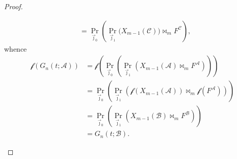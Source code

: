 \documentclass[10pt,a4paper]{amsart}
\newcommand{\A}{\mathcal{A}}
\newcommand{\B}{\mathcal{B}}
\newcommand{\C}{\mathcal{C}}
\newcommand{\f}{\mathcal{f}}
\begin{document}
\begin{proof}
\begin{enumerate}
\begin{align*}
            &= \Pr_{\vec\jmath_0}\left(\Pr_{\vec\jmath_1}\big( X_{m-1}(\C)  \big)\bowtie_m F^\C \right),
        \end{align*}
        whence
        \begin{align*}
            \f(G_n(t;\A)) &= \f\left( \Pr_{\vec\jmath_0}\left(\Pr_{\vec\jmath_1}\left( X_{m-1}(\A) \bowtie_m F^\A \right)\right) \right) \\
            &= \Pr_{\vec\jmath_0}\left(\Pr_{\vec\jmath_1}\left( \f(X_{m-1}(\A)) \bowtie_m \f(F^\A) \right)\right) \\
            &= \Pr_{\vec\jmath_0}\left(\Pr_{\vec\jmath_1}\left( X_{m-1}(\B) \bowtie_m F^\B \right)\right) \\
            &= G_n(t;\B).
        \end{align*}
    \end{enumerate}


\end{proof}
\end{document}
